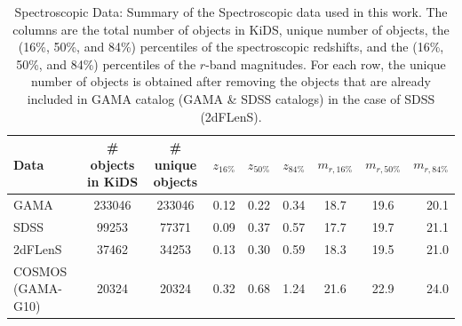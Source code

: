 \documentclass{aa}
\numberwithin{equation}{section}
\begin{document}
\begin{table}
	\centering
	\caption{{ Spectroscopic Data: Summary of the Spectroscopic data used in this work. The columns are the total number of objects in KiDS, unique number of objects, the (16\%, 50\%, and 84\%) percentiles of the spectroscopic redshifts, and the (16\%, 50\%, and 84\%) percentiles of the $r$-band magnitudes. For each row, the unique number of objects is obtained after removing the objects that are already included in GAMA catalog (GAMA \& SDSS catalogs) in the case of SDSS (2dFLenS).} 
    }
	\label{tab:zspec}
	\begin{tabularx}{1.95\columnwidth}{lcccccccr} %
		\hline
		Data &  \# objects in KiDS & \# unique objects & $z_{16\%}$ & $z_{50\%}$ & $z_{84\%}$ & $m_{r, 16\%}$ & $m_{r, 50\%}$ & $m_{r, 84\%}$\\
		\hline
		GAMA     & 233046 & 233046 & 0.12  & 0.22 & 0.34 & 18.7 & 19.6 & 20.1  \\
		SDSS     & 99253 &  77371  & 0.09  & 0.37 & 0.57 & 17.7 & 19.7 & 21.1  \\
        2dFLenS  & 37462 &  34253  & 0.13  & 0.30 & 0.59 & 18.3 & 19.5 & 21.0  \\
        COSMOS (GAMA-G10)   & 20324 &  20324  & 0.32 & 0.68 & 1.24 & 21.6 & 22.9 & 24.0 \\
		\hline
	\end{tabularx}
\end{table}




\end{document}
